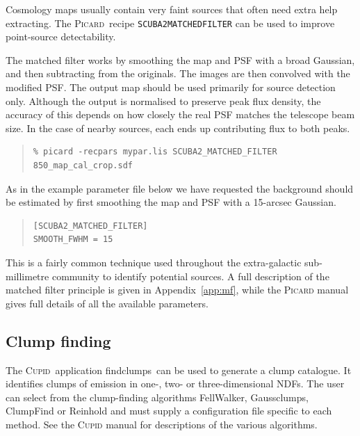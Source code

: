 \documentclass[twoside,11pt]{article}
\newcommand{\htmlref}[2]{#1}
\newcommand{\latex}[1]{#1}
\newcommand{\latexhtml}[2]{#1}
\newcommand{\xref}[3]{#1}
\newcommand{\xlabel}[1]{}
\renewcommand{\_}{\texttt{\symbol{95}}}
\newenvironment{myquote}{
   \color{MidnightBlue}\begin{quote}\begin{small}}{
   \end{small}\end{quote}
}
\newcommand{\cupid}{\xref{\textsc{Cupid}}{sun255}{}}
\newcommand{\picard}{\xref{\textsc{Picard}}{sun265}{}}
\newcommand{\drrecipe}[1]{\texttt{#1}}
\newcommand{\task}[1]{\textsf{#1}}
\newcommand{\findclumps}{\xref{\task{findclumps}}{sun255}{FINDCLUMPS}}
\newcommand{\cref}[3]{\latexhtml{#1~\ref{#2}}{\htmlref{#3}{#2}}}
\renewenvironment{myquote}{
      \begin{quote}\begin{small}}{
      \end{small}\end{quote}
   }
\begin{document}
Cosmology maps usually contain very faint sources that often need
extra help extracting. The \picard\ recipe
\xref{\drrecipe{SCUBA2\_MATCHED\_FILTER}}{sun265}{SCUBA2_MATCHED_FILTER}
can be used to improve point-source detectability.

The matched filter works by smoothing the map and PSF with a broad
Gaussian, and then subtracting from the originals. The images are then
convolved with the modified PSF. The output map should be used
primarily for source detection only. Although the output is normalised
to preserve peak flux density, the accuracy of this depends on how
closely the real PSF matches the telescope beam size. In the case of
nearby sources, each ends up contributing flux to both peaks.

\begin{myquote}
\begin{verbatim}
% picard -recpars mypar.lis SCUBA2_MATCHED_FILTER 850_map_cal_crop.sdf
\end{verbatim}
\end{myquote}

As in the example parameter file below we have requested the
background should be estimated by first smoothing the map and PSF with
a 15-arcsec Gaussian.
\begin{quote}
\begin{verbatim}
[SCUBA2_MATCHED_FILTER]
SMOOTH_FWHM = 15
\end{verbatim}
\end{quote}
\latex{\vspace{4mm}}

This is a fairly common technique used throughout the extra-galactic
sub-millimetre community to identify potential sources. A full
description of the matched filter principle is given in
\cref{Appendix}{app:mf}{SCUBA-2 matched filter}, while the \textsc{Picard}
manual gives full details of all the available parameters.

\subsection{\xlabel{clumps}Clump finding}
\label{sec:clumps}
\label{sec:clumpfind}

The \cupid\ application \findclumps\ can be used to generate a clump
catalogue. It identifies clumps of emission in one-, two- or
three-dimensional NDFs. The user can select from the clump-finding
algorithms FellWalker, Gaussclumps, ClumpFind or Reinhold and must
supply a configuration file specific to each method. See the
\xref{\textsc{Cupid} manual}{sun255}{} for descriptions of the various
algorithms.
\end{document}
